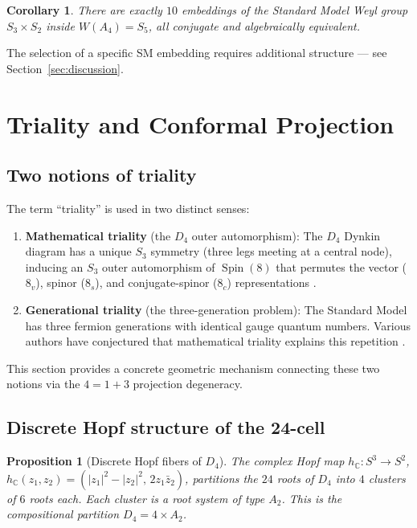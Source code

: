 \documentclass[11pt,reqno]{amsart}
\theoremstyle{plain}
\newtheorem{proposition}[theorem]{Proposition}
\newtheorem{corollary}[theorem]{Corollary}
\theoremstyle{definition}
\theoremstyle{remark}
\newcommand{\C}{\mathbb{C}}
\DeclareMathOperator{\Spin}{Spin}
\begin{document}
\begin{corollary}\label{cor:10embeddings}
There are exactly $10$ embeddings of the Standard Model Weyl
group $S_3 \times S_2$ inside $W(A_4) = S_5$,
all conjugate and algebraically equivalent.
\end{corollary}

The selection of a specific SM embedding requires additional
structure --- see Section~\ref{sec:discussion}.


\section{Triality and Conformal Projection}
\label{sec:triality}

\subsection{Two notions of triality}

The term ``triality'' is used in two distinct senses:

\begin{enumerate}[label=(\arabic*)]
\item \textbf{Mathematical triality} (the $D_4$ outer
  automorphism):
  The $D_4$ Dynkin diagram has a unique $S_3$ symmetry
  (three legs meeting at a central node),
  inducing an $S_3$ outer automorphism of $\Spin(8)$
  that permutes the vector ($8_v$), spinor ($8_s$), and
  conjugate-spinor ($8_c$) representations
  \cite{Cartan1925,Chevalley1954}.

\item \textbf{Generational triality} (the three-generation
  problem):
  The Standard Model has three fermion generations with
  identical gauge quantum numbers.
  Various authors have conjectured that mathematical triality
  explains this repetition \cite{Furey2016,Boyle2020}.
\end{enumerate}

This section provides a concrete geometric mechanism connecting
these two notions via the $4 = 1 + 3$ projection degeneracy.

\subsection{Discrete Hopf structure of the 24-cell}
\label{sec:hopfD4}

\begin{proposition}[Discrete Hopf fibers of $D_4$]
\label{prop:D4fibers}
The complex Hopf map
$h_{\C}\colon S^3 \to S^2$,
$h_{\C}(z_1,z_2) = (|z_1|^2 - |z_2|^2,\, 2z_1\bar{z}_2)$,
partitions the $24$ roots of $D_4$ into $4$ clusters of $6$
roots each.
Each cluster is a root system of type $A_2$.
This is the compositional partition $D_4 = 4 \times A_2$.
\end{proposition}
\end{document}
